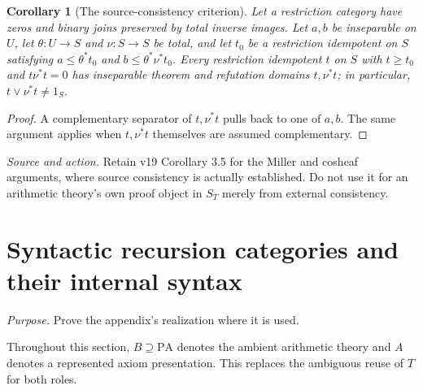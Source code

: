 \documentclass[11pt]{article}
\newtheorem{corollary}[theorem]{Corollary}
\theoremstyle{definition}\newtheorem{definition}[theorem]{Definition}
\newcommand{\PA}{\mathrm{PA}}
\newcommand{\source}[1]{\par\smallskip\noindent\textit{Source and action.} #1\par\smallskip}
\newcommand{\purpose}[1]{\noindent\textit{Purpose.} #1\par\medskip}
\begin{document}
\begin{corollary}[The source-consistency criterion]\label{cor:source-logical}
Let a restriction category have zeros and binary joins preserved by
total inverse images. Let $a,b$ be inseparable on $U$, let
$\theta:U\to S$ and $\nu:S\to S$ be total, and let $t_0$ be a
restriction idempotent on $S$ satisfying
$a\le\theta^*t_0$ and $b\le\theta^*\nu^*t_0$.
Every restriction idempotent $t$ on $S$ with $t\ge t_0$
and $t\nu^*t=0$ has inseparable theorem and refutation domains
$t,\nu^*t$; in particular, $t\vee\nu^*t\ne1_S$.
\end{corollary}
\begin{proof}
A complementary separator of $t,\nu^*t$ pulls back to one of
$a,b$. The same argument applies when $t,\nu^*t$ themselves are
assumed complementary.
\end{proof}
\source{Retain v19 Corollary 3.5 for the Miller and cosheaf arguments, where source consistency is actually established. Do not use it for an arithmetic theory's own proof object in $S_T$ merely from external consistency.}

\section{Syntactic recursion categories and their internal syntax}
\purpose{Prove the appendix's realization where it is used.}
Throughout this section, $B\supseteq\PA$ denotes the ambient
arithmetic theory and $A$ denotes a represented axiom presentation.
This replaces the ambiguous reuse of $T$ for both roles.
\end{document}
